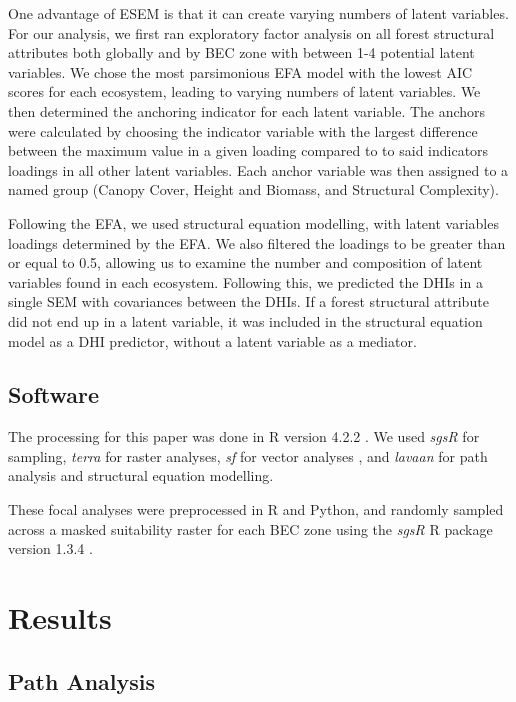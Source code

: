 \documentclass[
  authoryear,
  review,
  3p,
  twocolumn]{elsarticle}
\begin{document}
One advantage of ESEM is that it can create varying numbers of latent
variables. For our analysis, we first ran exploratory factor analysis on
all forest structural attributes both globally and by BEC zone with
between 1-4 potential latent variables. We chose the most parsimonious
EFA model with the lowest AIC scores for each ecosystem, leading to
varying numbers of latent variables. We then determined the anchoring
indicator for each latent variable. The anchors were calculated by
choosing the indicator variable with the largest difference between the
maximum value in a given loading compared to to said indicators loadings
in all other latent variables. Each anchor variable was then assigned to
a named group (Canopy Cover, Height and Biomass, and Structural
Complexity).

Following the EFA, we used structural equation modelling, with latent
variables loadings determined by the EFA. We also filtered the loadings
to be greater than or equal to 0.5, allowing us to examine the number
and composition of latent variables found in each ecosystem. Following
this, we predicted the DHIs in a single SEM with covariances between the
DHIs. If a forest structural attribute did not end up in a latent
variable, it was included in the structural equation model as a DHI
predictor, without a latent variable as a mediator.

\hypertarget{software}{%
\subsection{Software}\label{software}}

The processing for this paper was done in R version 4.2.2
\citep{R-base}. We used \emph{sgsR} \citep{goodbody2023} for sampling,
\emph{terra} \citep{R-terra} for raster analyses, \emph{sf} for vector
analyses \citep{R-sf}, and \emph{lavaan} \citep{lavaan2012} for path
analysis and structural equation modelling.

These focal analyses were preprocessed in R and Python, and randomly
sampled across a masked suitability raster for each BEC zone using the
\emph{sgsR} R package version 1.3.4 \citep{goodbody2023}.

\hypertarget{results}{%
\section{Results}\label{results}}

\hypertarget{path-analysis-1}{%
\subsection{Path Analysis}\label{path-analysis-1}}
\end{document}
